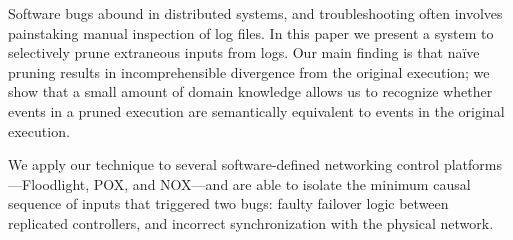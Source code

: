 Software bugs abound in distributed systems, and troubleshooting
often involves painstaking manual inspection of log files.
In this paper we present a system to selectively prune extraneous
inputs from logs. Our main finding is that na\"ive pruning
results in incomprehensible divergence from the original execution; we show
that a small amount of domain knowledge allows us to recognize whether events in
a pruned execution are semantically equivalent to events in the original
execution.

We apply our technique to several software-defined networking control
platforms---Floodlight, POX, and NOX---and
are able to isolate the minimum causal sequence of inputs that triggered
two bugs: faulty failover logic between replicated controllers, and incorrect
synchronization with the physical network.
